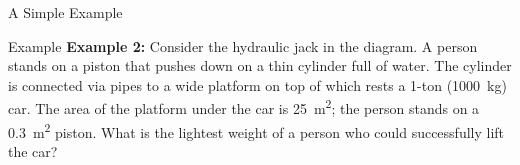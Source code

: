 \documentclass[12pt,aspectratio=169]{beamer}
\begin{document}
\begin{frame}{A Simple Example}
\end{frame}



\begin{frame}{Example}
  \textbf{Example 2:} Consider the hydraulic jack in the diagram. A person
  stands on a piston that pushes down on a thin cylinder full of water. The
  cylinder is connected via pipes to a wide platform on top of which rests a
  1-ton (\SI{1000}{\kilo\gram}) car. The area of the platform under the car is
  \SI{25}{\metre\squared}; the person stands on a \SI{.3}{\metre\squared}
  piston. What is the lightest weight of a person who could successfully lift
  the car?
  \begin{center}
    \vspace{-.2in}
    
  \end{center}
\end{frame}
\end{document}
